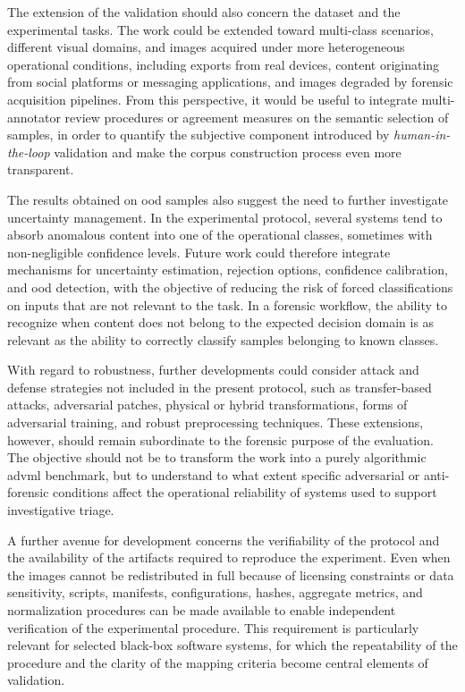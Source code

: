 The extension of the validation should also concern the dataset and the
experimental tasks. The work could be extended toward multi-class scenarios,
different visual domains, and images acquired under more heterogeneous
operational conditions, including exports from real devices, content originating
from social platforms or messaging applications, and images degraded by forensic
acquisition pipelines. From this perspective, it would be useful to integrate
multi-annotator review procedures or agreement measures on the semantic
selection of samples, in order to quantify the subjective component introduced
by \textit{human-in-the-loop} validation and make the corpus construction
process even more transparent.

The results obtained on \gls{ood} samples also suggest the need to further
investigate uncertainty management. In the experimental protocol, several
systems tend to absorb anomalous content into one of the operational classes,
sometimes with non-negligible confidence levels. Future work could therefore
integrate mechanisms for uncertainty estimation, rejection options, confidence
calibration, and \gls{ood} detection, with the objective of reducing the risk of
forced classifications on inputs that are not relevant to the task. In a
forensic workflow, the ability to recognize when content does not belong to the
expected decision domain is as relevant as the ability to correctly classify
samples belonging to known classes.

With regard to robustness, further developments could consider attack and
defense strategies not included in the present protocol, such as transfer-based
attacks, adversarial patches, physical or hybrid transformations, forms of
adversarial training, and robust preprocessing techniques. These extensions,
however, should remain subordinate to the forensic purpose of the evaluation.
The objective should not be to transform the work into a purely algorithmic
\gls{advml} benchmark, but to understand to what extent specific adversarial or
anti-forensic conditions affect the operational reliability of systems used to
support investigative triage.

A further avenue for development concerns the verifiability of the protocol and
the availability of the artifacts required to reproduce the experiment. Even
when the images cannot be redistributed in full because of licensing constraints
or data sensitivity, scripts, manifests, configurations, hashes, aggregate
metrics, and normalization procedures can be made available to enable
independent verification of the experimental procedure. This requirement is
particularly relevant for selected black-box software systems, for which the
repeatability of the procedure and the clarity of the mapping criteria become
central elements of validation.

